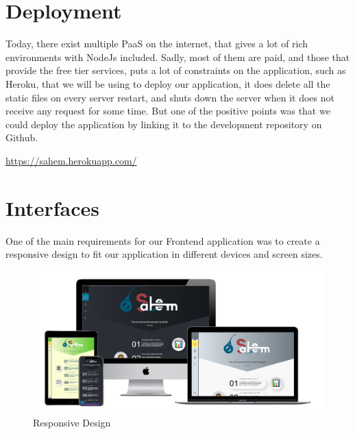 
\section{Deployment}
% 
Today, there exist multiple PaaS on the internet, that gives a lot of rich environments with NodeJs
included. Sadly, most of them are paid, and those that provide the free tier services, puts a lot
of constraints on the application, such as Heroku, that we will be using to deploy our application,
it does delete all the static files on every server restart, and shuts down the server when it does
not receive any request for some time. But one of the positive points was that we could deploy the
application by linking it to the development repository on Github.


\url{https://sahem.herokuapp.com/}


\section{Interfaces}

One of the main requirements for our Frontend application was to create a responsive design to fit our
application in different devices and screen sizes. 

\begin{figure}[H]
      \centering
      \includegraphics[scale=0.45]{assets/allDevices.png}
      \caption{Responsive Design}
      \label{fig:all devices}
\end{figure}


